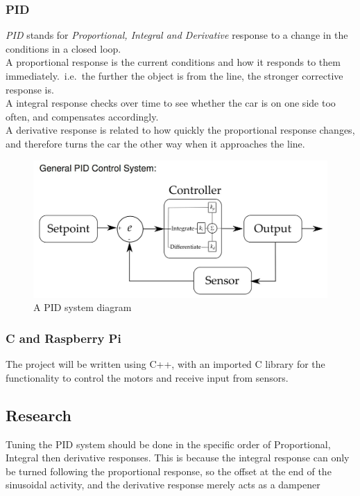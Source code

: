 \documentclass[paper=a4, fontsize=11pt]{scrartcl} %
\numberwithin{equation}{section} %
\numberwithin{figure}{section} %
\begin{document}
\subsubsection{PID}
\textit{PID} stands for \textit{Proportional, Integral and Derivative} response
to a change in the conditions in a closed loop.\\
A proportional response is the current conditions and how it responds to them
immediately.\ i.e.\ the further the object is from the line, the stronger
corrective response is.\\
A integral response checks over time to see whether the car is on one side too
often, and compensates accordingly.\\
A derivative response is related to how quickly the proportional response
changes, and therefore turns the car the other way when it approaches the line.
\begin{figure}[h]
\centering
\includegraphics[width=\textwidth]{pid.png}
\caption{A PID system diagram\autocite{elfClosedLoops}}
\end{figure}
\subsubsection{C and Raspberry Pi}
The project will be written using C++, with  an imported C library for the
functionality to control the motors and receive input from sensors.\\
\subsection{Research}
Tuning the PID system should be done in the specific order of Proportional,
Integral then derivative responses. This is because the integral response can
only be turned following the proportional response, so the offset at the end of
the sinusoidal activity, and the derivative response merely acts as a
dampener\autocite{pidTuning}
\autocite{pidVid}
\end{document}
